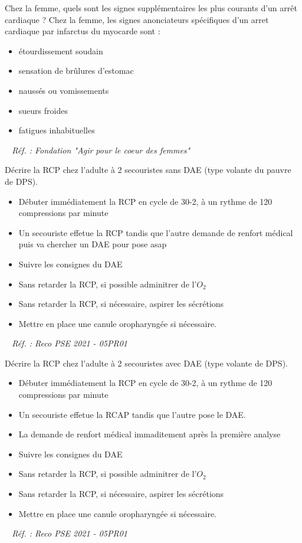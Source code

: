 \documentclass[grid,avery5371,landscape]{flashcards}
\makeatletter
\newcounter{nocarte}
\newcommand{\categ}[1]{%
  \def\@categ{#1}%
  \setcounter{nocarte}{0}%
}
\newcommand{\source}[1]{%
  \medskip
  \itshape%
   ~ \hfill Réf. : #1}
\makeatother
\begin{document}
\color[HTML]{003273}
\categ{PSE}
\begin{flashcard}[bilan]{
 Chez la femme, quels sont les signes supplémentaires les plus courants d'un arrêt cardiaque ?   }
  Chez la femme, les signes anonciateurs spécifiques d'un arret cardiaque par infarctus du myocarde sont : \begin{itemize} \item étourdissement soudain \item sensation de brûlures d'estomac \item naussés ou vomissements \item sueurs froides \item fatigues inhabituelles \end{itemize}
  \source{Fondation "Agir pour le coeur des femmes"}
\end{flashcard}


\color[HTML]{003273}
\categ{PSE}
\begin{flashcard}[CAT]{
 Décrire la RCP chez l'adulte à 2 secouristes sans DAE (type volante du pauvre de DPS).   }
  \begin{itemize} \item Débuter immédiatement la RCP en cycle de 30-2, à un rythme de 120 compressions par minute \item Un secouriste effetue la RCP tandis que l'autre  demande de renfort médical puis va chercher un DAE pour pose asap \item Suivre les consignes du DAE \item Sans retarder la RCP, si possible adminitrer de l'$O_2$ \item Sans retarder la RCP, si nécessaire, aspirer les sécrétions \item Mettre en place une canule oropharyngée si nécessaire. \end{itemize} 
  \source{Reco PSE 2021 - 05PR01}
\end{flashcard}


\color[HTML]{003273}
\categ{PSE}
\begin{flashcard}[CAT]{
 Décrire la RCP chez l'adulte à 2 secouristes avec DAE (type volante de DPS).   }
  \begin{itemize} \item Débuter immédiatement la RCP en cycle de 30-2, à un rythme de 120 compressions par minute \item Un secouriste effetue la RCAP tandis que l'autre pose le DAE. \item La demande de renfort médical immaditement après la première analyse \item Suivre les consignes du DAE \item Sans retarder la RCP, si possible adminitrer de l'$O_2$ \item Sans retarder la RCP, si nécessaire, aspirer les sécrétions \item Mettre en place une canule oropharyngée si nécessaire. \end{itemize}
  \source{Reco PSE 2021 - 05PR01}
\end{flashcard}
\end{document}
